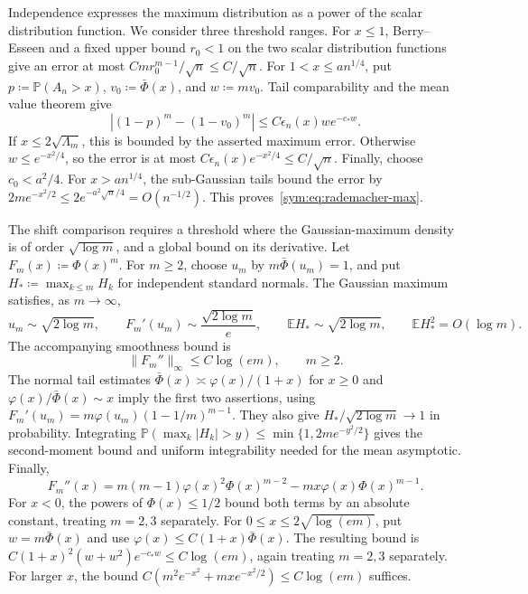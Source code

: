 \documentclass[11pt,letterpaper]{article}
\theoremstyle{remark}
\newcommand{\E}{\mathbb E}
\newcommand{\Pp}{\mathbb P}
\begin{document}
Independence expresses the maximum distribution as a power of the
scalar distribution function. We consider three threshold ranges.
For \(x\le1\),
Berry--Esseen and a fixed upper bound \(r_0<1\) on the two scalar
distribution functions give an error at most
\(Cm r_0^{m-1}/\sqrt n\le C/\sqrt n\). For
\(1<x\le an^{1/4}\), put \(p\coloneqq\Pp(A_n>x)\),
\(v_0\coloneqq\bar\Phi(x)\), and \(w\coloneqq mv_0\).
Tail comparability and the mean value theorem give
\[
 |(1-p)^m-(1-v_0)^m|\le C\epsilon_n(x)w e^{-c_*w}.
\]
If \(x\le2\sqrt{\Lambda_m}\), this is bounded by the asserted
maximum error. Otherwise \(w\le e^{-x^2/4}\), so the error is
at most \(C\epsilon_n(x)e^{-x^2/4}\le C/\sqrt n\).
Finally, choose \(c_0<a^2/4\). For \(x>an^{1/4}\), the
sub-Gaussian tails bound the error by
\(2m e^{-x^2/2}\le2e^{-a^2\sqrt n/4}=O(n^{-1/2})\).
This proves~\eqref{sym:eq:rademacher-max}.

The shift comparison requires a threshold where the Gaussian-maximum
density is of order \(\sqrt{\log m}\), and a global bound on its
derivative. Let
\(F_m(x)\coloneqq\Phi(x)^m\). For \(m\ge2\), choose \(u_m\) by
\(m\bar\Phi(u_m)=1\), and put \(H_*\coloneqq\max_{k\le m}H_k\)
for independent standard normals. The Gaussian maximum satisfies, as \(m\to\infty\),
\begin{equation}
 u_m\sim\sqrt{2\log m},\qquad
 F_m'(u_m)\sim\frac{\sqrt{2\log m}}e,\qquad
 \E H_*\sim\sqrt{2\log m},\qquad \E H_*^2=O(\log m).
 \label{sym:eq:gaussian-max}
\end{equation}
The accompanying smoothness bound is
\begin{equation}
 \|F_m''\|_\infty\le C\log(em),\qquad m\ge2.
 \label{sym:eq:gaussian-smoothness}
\end{equation}
The normal tail estimates
\(\bar\Phi(x)\asymp\varphi(x)/(1+x)\) for \(x\ge0\) and
\(\varphi(x)/\bar\Phi(x)\sim x\) imply the first two assertions,
using \(F_m'(u_m)=m\varphi(u_m)(1-1/m)^{m-1}\).
They also give \(H_*/\sqrt{2\log m}\to1\) in probability.
Integrating \(\Pp(\max_k|H_k|>y)\le\min\{1,2me^{-y^2/2}\}\)
gives the second-moment bound and uniform integrability needed for
the mean asymptotic. Finally,
\[
 F_m''(x)=m(m-1)\varphi(x)^2\Phi(x)^{m-2}
             -mx\varphi(x)\Phi(x)^{m-1}.
\]
For \(x<0\), the powers of \(\Phi(x)\le1/2\) bound both terms
by an absolute constant, treating \(m=2,3\) separately. For
\(0\le x\le2\sqrt{\log(em)}\), put \(w=m\bar\Phi(x)\) and use
\(\varphi(x)\le C(1+x)\bar\Phi(x)\). The resulting bound is
\(C(1+x)^2(w+w^2)e^{-c_*w}\le C\log(em)\), again treating
\(m=2,3\) separately. For larger \(x\), the bound
\(C(m^2e^{-x^2}+mx e^{-x^2/2})\le C\log(em)\) suffices.
\end{document}
